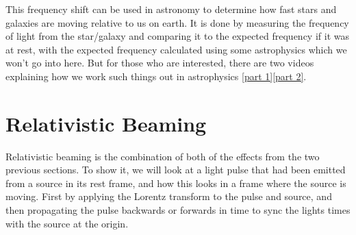 This frequency shift can be used in astronomy to determine how fast stars and galaxies are moving relative to us on earth.
It is done by measuring the frequency of light from the star/galaxy and comparing it to the expected frequency if it was at rest, with the expected frequency calculated using some astrophysics which we won't go into here.
But for those who are interested, there are two videos explaining how we work such things out in astrophysics \href{https://www.youtube.com/watch?v=YdOXS_9_P4U}{[part 1]}\href{https://www.youtube.com/watch?v=hFMaT9oRbs4}{[part 2]}.


\section{Relativistic Beaming} \label{sect: Relativistic Beaming}

Relativistic beaming is the combination of both of the effects from the two previous sections.
To show it, we will look at a light pulse that had been emitted from a source in its rest frame, and how this looks in a frame where the source is moving.
First by applying the Lorentz transform to the pulse and source, and then propagating the pulse backwards or forwards in time to sync the lights times with the source at the origin.

